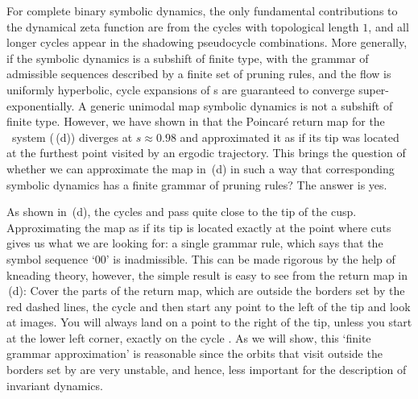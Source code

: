 \eea
{}

For complete binary symbolic dynamics, the only fundamental contributions to
the dynamical zeta function are from the cycles with topological length $1$, and all
longer cycles appear in the shadowing pseudocycle combinations.
More generally, if the symbolic dynamics is a subshift of finite type,
with the grammar of admissible sequences described by a finite set of pruning rules,
and the flow is uniformly hyperbolic, cycle expansions of {\Fd s}
are guaranteed to converge super-exponentially.
A generic unimodal map symbolic dynamics is not a subshift of finite type.
However, we have shown in  that the Poincar\'e return map for
the \twomode\ system (\,(d)) diverges at
$s \approx 0.98$ and approximated it as if its tip was located at the
furthest point visited by an ergodic trajectory. This brings the question of
whether we can approximate the map in \,(d) in such a way
that corresponding symbolic dynamics has a finite grammar of pruning rules?
The answer is yes.

As shown in \,(d), the cycles 
and  pass quite close to the tip of the cusp. Approximating the
map as if its tip is located exactly at the point where  cuts gives us
what we are looking for: a single grammar rule, which says that the symbol
sequence `00' is inadmissible. This can be made rigorous by the help of
kneading theory, however, the simple result is easy to see from the return map
in \,(d): Cover the parts of the return map, which
are outside the borders set by the red dashed lines, the cycle  and
then start any point to the left of the tip and look at images. You will always
land on a point to the right of the tip, unless you start at the lower left
corner, exactly on the cycle . As we will show, this `finite grammar
approximation' is reasonable since the orbits that visit outside
the borders set by  are very unstable, and hence, less
important for the description of invariant dynamics.

